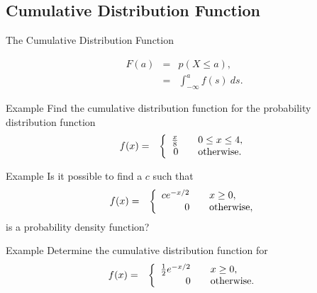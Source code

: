 \subsection{Cumulative Distribution Function}

\begin{frame}{The Cumulative Distribution Function}

  \begin{definition}
    \begin{eqnarray*}
      F(a) & = & p(X \leq a), \\
      & = & \int^a_{-\infty} f(s) ~ ds.
    \end{eqnarray*}
  \end{definition}
\end{frame}


\begin{frame}{Example}
  Find the cumulative distribution function for the probability
  distribution function
  \begin{eqnarray*}
    f(x) & = & \left\{
    \begin{array}{r@{\hspace{2em}}l}
      \frac{x}{8} & 0\leq x \leq 4, \\
      0 & \mathrm{otherwise}.
    \end{array}
  \right.
  \end{eqnarray*}

\end{frame}

\begin{frame}{Example}
  Is it possible to find a $c$ such that
  \begin{eqnarray*}
    f(x) & = & \left\{
    \begin{array}{r@{\hspace{2em}}l}
      c e^{-x/2} &  x \geq 0, \\
      0 & \mathrm{otherwise},
    \end{array}
    \right.
  \end{eqnarray*}
  is a probability density function?
\end{frame}

\begin{frame}{Example}
  Determine the cumulative distribution function for 
  \begin{eqnarray*}
    f(x) & = & \left\{
    \begin{array}{r@{\hspace{2em}}l}
      \half e^{-x/2} &  x \geq 0, \\
      0 & \mathrm{otherwise}.
    \end{array}
    \right.
  \end{eqnarray*}
\end{frame}



